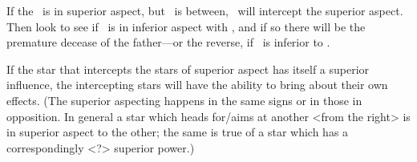 If the \Sun\, is in superior aspect, but \Venus\, is between, \Venus\, will intercept the superior aspect.  Then look to see if \Saturn\, is in inferior aspect with \Venus, and if so there will be the premature decease of the father—or the reverse, if \Venus\, is inferior to \Saturn. 

If  the star that intercepts the stars of superior aspect has itself a superior influence, the intercepting stars will have the ability to bring about their own effects. (The superior aspecting happens in the same signs or in those in opposition. In general a star which heads for/aims at another <from the right> is in superior aspect to the other; the same is true of a star which has a correspondingly <?> superior power.)

\newpage
